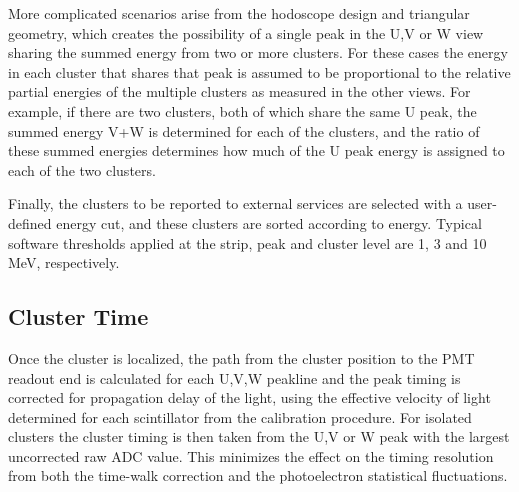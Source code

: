 More complicated scenarios arise from the hodoscope design and triangular geometry, which creates the possibility of a single peak in the U,V or W view sharing the summed energy from two or more clusters.  For these cases the energy in each cluster that shares that peak is assumed to be proportional to the relative partial energies of the multiple clusters as measured in the other views.  For example, if there are two clusters, both of which share the same U peak, the summed energy V+W is determined for each of the clusters, and the ratio of these summed energies determines how much of the U peak energy is  assigned to each of the two clusters.  

Finally, the clusters to be reported to external services are selected with a user-defined energy cut, and these clusters are sorted according to energy. Typical software thresholds applied at the strip, peak and cluster level are 1, 3 and 10 MeV, respectively. 

\subsection {Cluster Time}

Once the cluster is localized, the path from the cluster position to the PMT readout end is calculated for each U,V,W peakline and the peak timing is corrected for propagation delay of the light, using the effective velocity of light determined for each scintillator from the calibration procedure.  For isolated clusters the cluster timing is then taken from the U,V or W peak with the largest uncorrected raw ADC value.  This minimizes the effect on the timing resolution from both the time-walk correction and the photoelectron statistical fluctuations.


